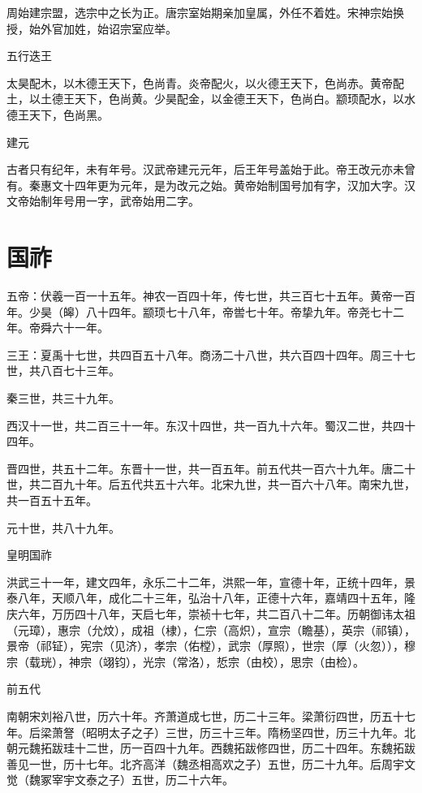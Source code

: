 \documentclass[a4paper,12pt,UTF8,twoside]{ctexbook}
\begin{document}
    周始建宗盟，选宗中之长为正。唐宗室始期亲加皇属，外任不着姓。宋神宗始换授，始外官加姓，始诏宗室应举。
    
    五行迭王
    
    太昊配木，以木德王天下，色尚青。炎帝配火，以火德王天下，色尚赤。黄帝配土，以土德王天下，色尚黄。少昊配金，以金德王天下，色尚白。颛顼配水，以水德王天下，色尚黑。
    
    建元
    
    古者只有纪年，未有年号。汉武帝建元元年，后王年号盖始于此。帝王改元亦未曾有。秦惠文十四年更为元年，是为改元之始。黄帝始制国号加有字，汉加大字。汉文帝始制年号用一字，武帝始用二字。
    
    \section{国祚}
    
    五帝：伏羲一百一十五年。神农一百四十年，传七世，共三百七十五年。黄帝一百年。少昊（皞）八十四年。颛顼七十八年，帝喾七十年。帝挚九年。帝尧七十二年。帝舜六十一年。
    
    三王：夏禹十七世，共四百五十八年。商汤二十八世，共六百四十四年。周三十七世，共八百七十三年。
    
    秦三世，共三十九年。
    
    西汉十一世，共二百三十一年。东汉十四世，共一百九十六年。蜀汉二世，共四十四年。
    
    晋四世，共五十二年。东晋十一世，共一百五年。前五代共一百六十九年。唐二十世，共二百九十年。后五代共五十六年。北宋九世，共一百六十八年。南宋九世，共一百五十五年。
    
    元十世，共八十九年。
    
    皇明国祚
    
    洪武三十一年，建文四年，永乐二十二年，洪熙一年，宣德十年，正统十四年，景泰八年，天顺八年，成化二十三年，弘治十八年，正德十六年，嘉靖四十五年，隆庆六年，万历四十八年，天启七年，崇祯十七年，共二百八十二年。历朝御讳太祖（元璋），惠宗（允炆），成祖（棣），仁宗（高炽），宣宗（瞻基），英宗（祁镇），景帝（祁钲），宪宗（见济），孝宗（佑樘），武宗（厚照），世宗（厚（火忽）），穆宗（载珖），神宗（翊钧），光宗（常洛），悊宗（由校），思宗（由检）。
    
    前五代
    
    南朝宋刘裕八世，历六十年。齐萧道成七世，历二十三年。梁萧衍四世，历五十七年。后梁萧詧（昭明太子之子）三世，历三十三年。隋杨坚四世，历三十九年。北朝元魏拓跋珪十二世，历一百四十九年。西魏拓跋修四世，历二十四年。东魏拓跋善见一世，历十七年。北齐高洋（魏丞相高欢之子）五世，历二十九年。后周宇文觉（魏冢宰宇文泰之子）五世，历二十六年。
    
\end{document}
